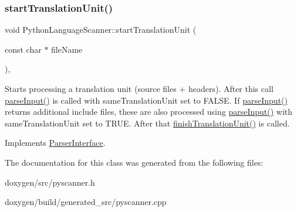 \mbox{\label{class_python_language_scanner_ae67929ac5a3d38fc925157f7a5f43497}} 
\subsubsection{\texorpdfstring{startTranslationUnit()}{startTranslationUnit()}}
{\footnotesize\ttfamily void Python\+Language\+Scanner\+::start\+Translation\+Unit (\begin{DoxyParamCaption}\item[{const char $\ast$}]{file\+Name }\end{DoxyParamCaption})\hspace{0.3cm}{\ttfamily [inline]}, {\ttfamily [virtual]}}

Starts processing a translation unit (source files + headers). After this call \mbox{\hyperlink{class_python_language_scanner_a6848c585fe2a19cd36ed34540dc3fdce}{parse\+Input()}} is called with same\+Translation\+Unit set to F\+A\+L\+SE. If \mbox{\hyperlink{class_python_language_scanner_a6848c585fe2a19cd36ed34540dc3fdce}{parse\+Input()}} returns additional include files, these are also processed using \mbox{\hyperlink{class_python_language_scanner_a6848c585fe2a19cd36ed34540dc3fdce}{parse\+Input()}} with same\+Translation\+Unit set to T\+R\+UE. After that \mbox{\hyperlink{class_python_language_scanner_a97ca623055615c143e63ea98be819f86}{finish\+Translation\+Unit()}} is called. 

Implements \mbox{\hyperlink{class_parser_interface_a72478f87ead5fde10d7d6bbe32a73024}{Parser\+Interface}}.



The documentation for this class was generated from the following files\+:\begin{DoxyCompactItemize}
\item 
doxygen/src/pyscanner.\+h\item 
doxygen/build/generated\+\_\+src/pyscanner.\+cpp\end{DoxyCompactItemize}
